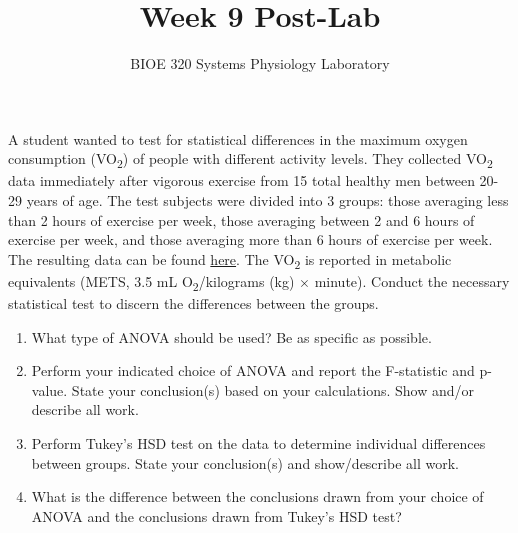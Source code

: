 \documentclass{article}
\title{Week 9 Post-Lab}
\author{BIOE 320 Systems Physiology Laboratory}
\date{}
\begin{document}
\maketitle
\large

A student wanted to test for statistical differences in the maximum oxygen consumption (VO\textsubscript{2}) of people with different activity levels. They collected VO\textsubscript{2} data immediately after vigorous exercise from 15 total healthy men between 20-29 years of age. The test subjects were divided into 3 groups: those averaging less than 2 hours of exercise per week, those averaging between 2 and 6 hours of exercise per week, and those averaging more than 6 hours of exercise per week. The resulting data can be found \href{https://jameslong12.github.io/BIOE320/Assignments.html}{here}. The VO\textsubscript{2} is reported in metabolic equivalents (METS, 3.5 mL O\textsubscript{2}/kilograms (kg) $\times$ minute). Conduct the necessary statistical test to discern the differences between the groups.

\begin{enumerate}
	\item What type of ANOVA should be used? Be as specific as possible.
	\item Perform your indicated choice of ANOVA and report the F-statistic and p-value. State your conclusion(s) based on your calculations. Show and/or describe all work.
	\item Perform Tukey's HSD test on the data to determine individual differences between groups. State your conclusion(s) and show/describe all work.
	\item What is the difference between the conclusions drawn from your choice of ANOVA and the conclusions drawn from Tukey's HSD test?
\end{enumerate}
\end{document}
